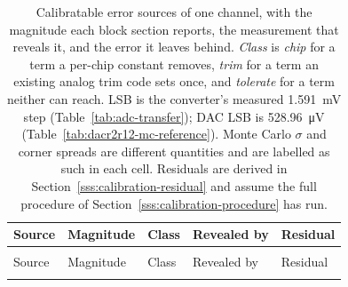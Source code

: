 {\footnotesize
\setlength{\tabcolsep}{4pt}
\begin{longtable}{@{}%
  >{\raggedright\arraybackslash}p{}%
  >{\raggedright\arraybackslash}p{}%
  >{\raggedright\arraybackslash}p{}%
  >{\raggedright\arraybackslash}p{}%
  >{\raggedright\arraybackslash}p{}@{}}
  \caption[{Calibratable error sources of one channel.}]{Calibratable error
  sources of one channel, with the magnitude each block section reports, the
  measurement that reveals it, and the error it leaves behind. \emph{Class} is
  \emph{chip} for a term a per-chip constant removes, \emph{trim} for a term an
  existing analog trim code sets once, and \emph{tolerate} for a term neither
  can reach. LSB is the converter's measured \SI{1.591}{\milli\volt} step
  (Table~\ref{tab:adc-transfer}); DAC LSB is \SI{528.96}{\micro\volt}
  (Table~\ref{tab:dacr2r12-mc-reference}). Monte Carlo \(\sigma\) and corner
  spreads are different quantities and are labelled as such in each cell.
  Residuals are derived in Section~\ref{sss:calibration-residual} and assume the
  full procedure of Section~\ref{sss:calibration-procedure} has run.}
  \label{tab:calibration-errors} \\
  \toprule
  Source & Magnitude & Class & Revealed by & Residual \\
  \midrule
  \endfirsthead
  \multicolumn{5}{@{}l}{\emph{Table~\ref{tab:calibration-errors}, continued}} \\
  \toprule
  Source & Magnitude & Class & Revealed by & Residual \\
  \midrule
  \endhead
  \bottomrule
  \endlastfoot


\end{longtable}}
